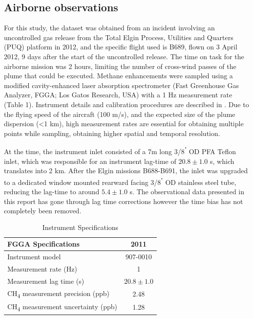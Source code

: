 \documentclass[12pt]{article}
\begin{document}
\subsection{Airborne observations}

For this study, the dataset was obtained from an incident involving an uncontrolled gas release from the Total Elgin  Process, Utilities and Quarters (PUQ)  platform in 2012, and the specific flight used is B689, flown on 3 April 2012, 9 days after the start of the uncontrolled release. The time on task for the airborne mission was 2 hours, limiting the number of cross-wind passes of the plume that could be executed.  Methane enhancements were sampled using a modified cavity-enhanced laser absorption spectrometer (Fast Greenhouse Gas Analyzer, FGGA; Los Gatos Research, USA) with a 1 Hz measurement rate (Table 1). Instrument details and calibration procedures are described in \cite{OShea2013DevelopmentCOampltsubampgt2amplt/subampgt, Lee2018FlowRelease}. Due to the flying speed of the aircraft (100 m/s), and the expected size of the plume dispersion (<1 km), high measurement rates are essential for obtaining multiple points while sampling, obtaining higher spatial and temporal resolution. 

At the time, the instrument inlet consisted of a 7m long 3/8\textsuperscript{"} OD PFA Teflon inlet, which was responsible for an instrument lag-time of $20.8 \pm 1.0$ s, 
 which translates into 2 km. After the Elgin missions B688-B691, the inlet was upgraded to a dedicated window mounted rearward facing 3/8\textsuperscript{"} OD stainless steel tube, reducing the lag-time to around $5.4 \pm 1.0$ s. The observational data presented in this report has gone through lag time corrections however the time bias has not completely been removed. 

 
\begin{table}[H]
\centering
\caption{Instrument Specifications
\parencite{Lee2018FlowRelease, OShea2013DevelopmentCOampltsubampgt2amplt/subampgt}}
\label{tab:fgga-specs}
\begin{tabular}{lc}
\toprule
FGGA Specifications & 2011 \\ 
\midrule
Instrument model & 907-0010 \\
Measurement rate (Hz) & 1 \\
Measurement lag time (s) & $20.8 \pm 1.0$  \\
CH\textsubscript{4} measurement precision (ppb) & 2.48 \\
CH\textsubscript{4} measurement uncertainty (ppb) & 1.28 \\
\bottomrule
\end{tabular}
\end{table}
\end{document}
